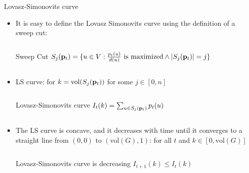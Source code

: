 \documentclass[../main.tex]{subfiles}
\begin{document}
    \begin{frame}{Lovasz-Simonovits curve}
        \begin{itemize}
            \item It is easy to define the Lovasz Simonovits curve using the definition of a sweep cut:
                \begin{columns}
                    \begin{block}{Sweep Cut}
                        $S_j(\bold{p}_t) = \{u\in V: \frac{p_t(u)}{d(u)} \text{ is maximized} \land |S_j(\bold{p}_t)| = j\}$
                    \end{block}
                \end{columns}
            \item LS curve: for $k = \text{vol}(S_j(\bold{p}_t))$ for some $j\in[0,n]$
                \begin{columns}
                    \begin{block}{Lovasz-Simonovits curve}
                        $I_t(k) = \sum_{u\in S_j(\bold{p}_t)} p_t(u)$
                    \end{block}
                \end{columns}
            \item The LS curve is concave, and it decreases with time until it converges to a straight line from $(0,0)$ to $(\text{vol}(G), 1)$: for all $t$ and $k\in[0,\text{vol}(G)]$
                \begin{columns}
                    \begin{block}{Lovasz-Simonovits curve is decreasing} 
                        $I_{t+1}(k) \leq I_{t}(k)$
                    \end{block}
                \end{columns}
        \end{itemize}
    \end{frame}
    
\end{document}
